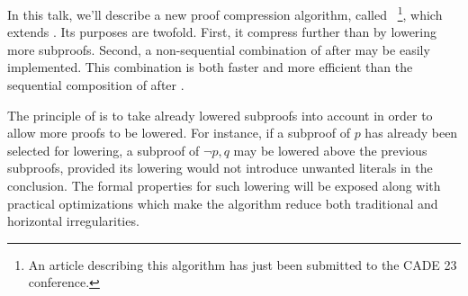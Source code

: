 \documentclass{easychair}
\begin{document}
In this talk, we'll describe a new proof compression algorithm, called \LowerUnivalents~\footnote{An article describing
this algorithm has just been submitted to the CADE 23 conference.}, which extends \LowerUnits. Its
purposes are twofold. First, it compress further than \LowerUnits by lowering
more subproofs. Second, a non-sequential combination of \LowerUnivalents after
\RecyclePivotsIntersection may be easily implemented. This combination is both faster and more
efficient than the sequential composition of \LowerUnits after \RecyclePivotsIntersection.

The principle of \LowerUnivalents is to take already lowered subproofs into account in order to
allow more proofs to be lowered. For instance, if a subproof of $p$ has already been selected for
lowering, a subproof of $\neg p, q$ may be lowered above the previous subproofs, provided its
lowering would not introduce unwanted literals in the conclusion. The formal properties for such
lowering will be exposed along with practical optimizations which make the algorithm reduce both
traditional and horizontal irregularities.




\end{document}
